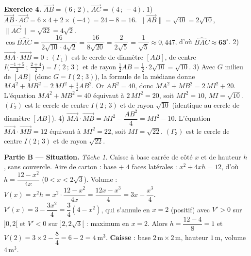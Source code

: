 \smallskip
\noindent\textbf{Exercice 4.}
$\vec{AB}=(6\,;\,2)$, $\vec{AC}=(4\,;\,-4)$.
1) $\vec{AB}\cdot\vec{AC}=6\times4+2\times(-4)=24-8=16$. $\|\vec{AB}\|=\sqrt{40}=2\sqrt{10}$,
$\|\vec{AC}\|=\sqrt{32}=4\sqrt2$. $\cos\widehat{BAC}=\dfrac{16}{2\sqrt{10}\cdot4\sqrt2}
=\dfrac{16}{8\sqrt{20}}=\dfrac{2}{2\sqrt5}=\dfrac{1}{\sqrt5}\approx0{,}447$, d'où
$\widehat{BAC}\approx\mathbf{63^\circ}$.
2) $\vec{MA}\cdot\vec{MB}=0$ : $(\Gamma_1)$ est le cercle de diamètre $[AB]$, de centre
$I\big(\tfrac{-1+5}{2}\,;\,\tfrac{2+4}{2}\big)=I(2\,;\,3)$ et de rayon
$\tfrac12 AB=\tfrac12\cdot2\sqrt{10}=\sqrt{10}$.
3) Avec $G$ milieu de $[AB]$ (donc $G=I(2\,;\,3)$), la formule de la médiane donne
$MA^2+MB^2=2\,MI^2+\tfrac12 AB^2$. Or $AB^2=40$, donc $MA^2+MB^2=2\,MI^2+20$. L'équation
$MA^2+MB^2=40$ équivaut à $2\,MI^2=20$, soit $MI^2=10$, $MI=\sqrt{10}$. $(\Gamma_2)$ est le
cercle de centre $I(2\,;\,3)$ et de rayon $\sqrt{10}$ (identique au cercle de diamètre $[AB]$).
4) $\vec{MA}\cdot\vec{MB}=MI^2-\dfrac{AB^2}{4}=MI^2-10$. L'équation
$\vec{MA}\cdot\vec{MB}=12$ équivaut à $MI^2=22$, soit $MI=\sqrt{22}$. $(\Gamma_3)$ est le
cercle de centre $I(2\,;\,3)$ et de rayon $\sqrt{22}$.

\begin{center}
\end{center}

\smallskip
\noindent\textbf{Partie B — Situation.}
\emph{Tâche 1.} Caisse à base carrée de côté $x$ et de hauteur $h$, sans couvercle.
Aire de carton : base $+$ $4$ faces latérales : $x^2+4xh=12$, d'où $h=\dfrac{12-x^2}{4x}$
($0<x<2\sqrt3$). Volume : $V(x)=x^2h=x^2\cdot\dfrac{12-x^2}{4x}=\dfrac{12x-x^3}{4}=3x-\dfrac{x^3}{4}$.
$V'(x)=3-\dfrac{3x^2}{4}=\dfrac34(4-x^2)$, qui s'annule en $x=2$ (positif) avec $V'>0$ sur
$]0,2[$ et $V'<0$ sur $]2,2\sqrt3[$ : maximum en $x=2$. Alors $h=\dfrac{12-4}{8}=1$ et
$V(2)=3\times2-\dfrac{8}{4}=6-2=\SI{4}{\metre\cubed}$. \textbf{Caisse} : base
$2\,\text{m}\times2\,\text{m}$, hauteur $1\,\text{m}$, volume \textbf{$4\,\text{m}^3$}.

